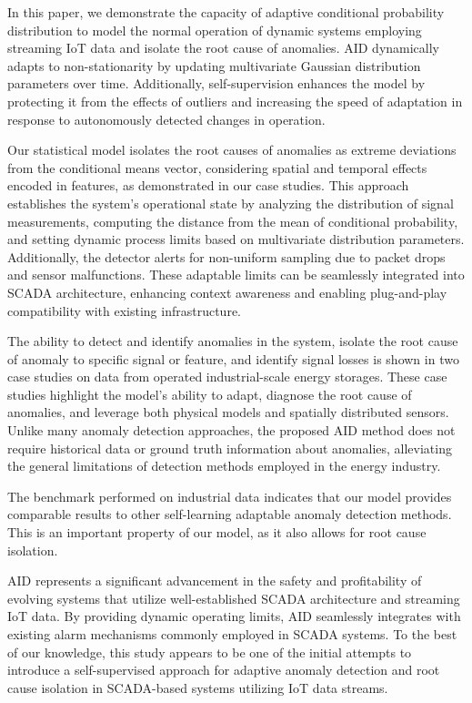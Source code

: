 In this paper, we demonstrate the capacity of adaptive conditional probability distribution to model the normal operation of dynamic systems employing streaming IoT data and isolate the root cause of anomalies. AID dynamically adapts to non-stationarity by updating multivariate Gaussian distribution parameters over time. Additionally, self-supervision enhances the model by protecting it from the effects of outliers and increasing the speed of adaptation in response to autonomously detected changes in operation.

Our statistical model isolates the root causes of anomalies as extreme deviations from the conditional means vector, considering spatial and temporal effects encoded in features, as demonstrated in our case studies. This approach establishes the system's operational state by analyzing the distribution of signal measurements, computing the distance from the mean of conditional probability, and setting dynamic process limits based on multivariate distribution parameters. Additionally, the detector alerts for non-uniform sampling due to packet drops and sensor malfunctions. These adaptable limits can be seamlessly integrated into SCADA architecture, enhancing context awareness and enabling plug-and-play compatibility with existing infrastructure.

The ability to detect and identify anomalies in the system, isolate the root cause of anomaly to specific signal or feature, and identify signal losses is shown in two case studies on data from operated industrial-scale energy storages. These case studies highlight the model's ability to adapt, diagnose the root cause of anomalies, and leverage both physical models and spatially distributed sensors. Unlike many anomaly detection approaches, the proposed AID method does not require historical data or ground truth information about anomalies, alleviating the general limitations of detection methods employed in the energy industry.

The benchmark performed on industrial data indicates that our model provides comparable results to other self-learning adaptable anomaly detection methods. This is an important property of our model, as it also allows for root cause isolation.

AID represents a significant advancement in the safety and profitability of evolving systems that utilize well-established SCADA architecture and streaming IoT data. By providing dynamic operating limits, AID seamlessly integrates with existing alarm mechanisms commonly employed in SCADA systems. To the best of our knowledge, this study appears to be one of the initial attempts to introduce a self-supervised approach for adaptive anomaly detection and root cause isolation in SCADA-based systems utilizing IoT data streams.

